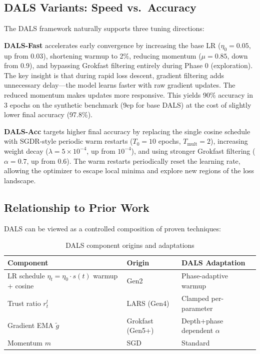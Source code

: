 \documentclass[a4paper,fleqn]{cas-dc}
\begin{document}
\subsection{DALS Variants: Speed vs.\ Accuracy}

The DALS framework naturally supports three tuning directions:

\textbf{DALS-Fast} accelerates early convergence by increasing the base LR ($\eta_0 = 0.05$, up from 0.03), shortening warmup to 2\%, reducing momentum ($\mu = 0.85$, down from 0.9), and bypassing Grokfast filtering entirely during Phase 0 (exploration). The key insight is that during rapid loss descent, gradient filtering adds unnecessary delay---the model learns faster with raw gradient updates. The reduced momentum makes updates more responsive. This yields 90\% accuracy in 3 epochs on the synthetic benchmark (9ep for base DALS) at the cost of slightly lower final accuracy (97.8\%).

\textbf{DALS-Acc} targets higher final accuracy by replacing the single cosine schedule with SGDR-style periodic warm restarts ($T_0 = 10$ epochs, $T_{\text{mult}} = 2$), increasing weight decay ($\lambda = 5 \times 10^{-4}$, up from $10^{-4}$), and using stronger Grokfast filtering ($\alpha = 0.7$, up from 0.6). The warm restarts periodically reset the learning rate, allowing the optimizer to escape local minima and explore new regions of the loss landscape.

\subsection{Relationship to Prior Work}

DALS can be viewed as a controlled composition of proven techniques:

\begin{table}[h]
\centering
\footnotesize
\renewcommand{\arraystretch}{1.5}
\renewcommand{\tabularxcolumn}[1]{>{\centering\arraybackslash}m{#1}}
\caption{DALS component origins and adaptations}\label{tab:dals_components}
\begin{tabularx}{\columnwidth}{@{} >{\centering\arraybackslash}X m{1.5cm} m{2.2cm} @{}}
\toprule
Component & Origin & DALS Adaptation \\
\midrule
LR schedule \newline $\eta_t = \eta_0 \cdot s(t)$ \newline warmup + cosine & Gen2 & Phase-adaptive \newline warmup \\
\addlinespace[2pt]
Trust ratio $r_t^l$ & LARS (Gen4) & Clamped \newline per-parameter \\
\addlinespace[2pt]
Gradient EMA $\tilde{g}$ & Grokfast (Gen5+) & Depth+phase \newline dependent $\alpha$ \\
\addlinespace[2pt]
Momentum $m$ & SGD & Standard \\
\bottomrule
\end{tabularx}
\end{table}
\end{document}
